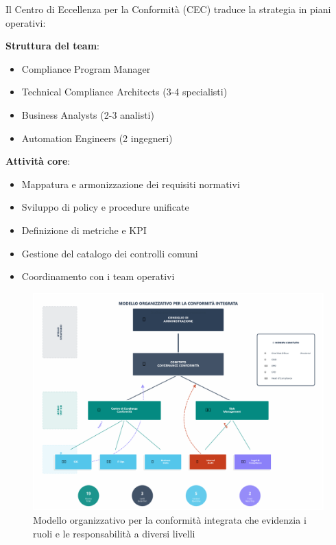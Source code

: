Il Centro di Eccellenza per la Conformità (CEC) traduce la strategia in piani operativi:

\textbf{Struttura del team}:
\begin{itemize}
    \item Compliance Program Manager
    \item Technical Compliance Architects (3-4 specialisti)
    \item Business Analysts (2-3 analisti)
    \item Automation Engineers (2 ingegneri)
\end{itemize}

\textbf{Attività core}:
\begin{itemize}
    \item Mappatura e armonizzazione dei requisiti normativi
    \item Sviluppo di policy e procedure unificate
    \item Definizione di metriche e KPI
    \item Gestione del catalogo dei controlli comuni
    \item Coordinamento con i team operativi
\end{itemize}

\begin{figure}[htbp]
\centering
\includegraphics[width=1.1\textwidth]{thesis_figures/cap4/organigramma_moderno.pdf
}
\caption[Modello organizzativo per la conformità integrata]{Modello organizzativo per la conformità integrata che evidenzia i ruoli e le responsabilità a diversi livelli}
\label{fig:org_structure}
\end{figure}
